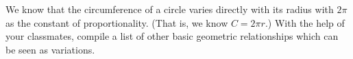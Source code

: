 {We know that the circumference of a circle varies directly with its radius with $2\pi$ as the constant of proportionality. (That is, we know $C = 2\pi r.$)  With the help of your classmates, compile a list of other basic geometric relationships which can be seen as variations.}
{}